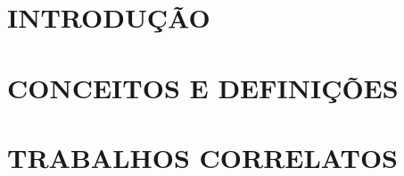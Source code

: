 \documentclass[
	12pt,				%
  oneside,
	a4paper,			%
	chapter=TITLE,		%
	english,			%
	brazil				%
	]{abntex2}
\begin{document}
\renewcommand{\listtablename}{Lista de Tabelas}
\listoftables*
\cleardoublepage



\renewcommand{\contentsname}{Sumário}
\tableofcontents*
\cleardoublepage



\textual
\chapter{INTRODUÇÃO}


\chapter{CONCEITOS E DEFINIÇÕES}


\chapter{TRABALHOS CORRELATOS}

\end{document}
